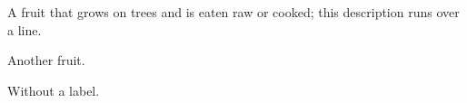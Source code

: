 \documentclass{article}
\begin{document}
\begin{description}
\item[Apple] A fruit that grows on trees and is eaten raw or cooked; this description runs
over a line.
\item[Banana] Another fruit.
\item Without a label.
\end{description}
\end{document}
